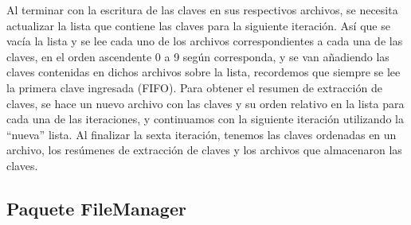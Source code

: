 \documentclass[11pt]{article}
\begin{document}
\par
Al terminar con la escritura de las claves en sus respectivos archivos, se necesita actualizar la lista que contiene las claves para la siguiente iteración. Así que se vacía la lista y se lee cada uno de los archivos correspondientes a cada una de las claves, en el orden ascendente 0 a 9 según corresponda, y se van añadiendo las claves contenidas en dichos archivos sobre la lista, recordemos que siempre se lee la primera clave ingresada (FIFO). Para obtener el resumen de extracción de claves, se hace un nuevo archivo con las claves y su orden relativo en la lista para cada una de las iteraciones, y continuamos con la siguiente iteración utilizando la “nueva” lista. Al finalizar la sexta iteración, tenemos las claves ordenadas en un archivo, los resúmenes de extracción de claves y los archivos que almacenaron las claves.

\subsection{Paquete FileManager}
\end{document}
